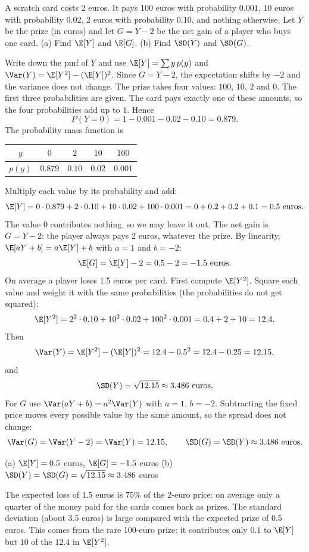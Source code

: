 
\begin{problem}
	A scratch card costs 2 euros. It pays 100 euros with probability $0.001$,
	10 euros with probability $0.02$, 2 euros with probability $0.10$, and
	nothing otherwise. Let $Y$ be the prize (in euros) and let $G=Y-2$ be the
	net gain of a player who buys one card. (a) Find $\E[Y]$ and $\E[G]$.
	(b) Find $\SD(Y)$ and $\SD(G)$.
\end{problem}

\begin{solution}
	\idea Write down the pmf of $Y$ and use $\E[Y]=\sum y\,p(y)$ and
	$\Var(Y)=\E[Y^2]-(\E[Y])^2$. Since $G=Y-2$, the expectation shifts by $-2$
	and the variance does not change.
	 The prize takes four values: $100$, $10$,
	$2$ and $0$. The first three probabilities are given. The card pays exactly
	one of these amounts, so the four probabilities add up to $1$. Hence
	\[ P(Y=0)=1-0.001-0.02-0.10=0.879. \]
	The probability mass function is
	\begin{center}
		\begin{tabular}{c|cccc}
			$y$      & $0$     & $2$    & $10$   & $100$   \\ \hline
			$p(y)$   & $0.879$ & $0.10$ & $0.02$ & $0.001$
		\end{tabular}
	\end{center}
	 Multiply each value by its probability and add:
	\[ \E[Y]=0\cdot0.879+2\cdot0.10+10\cdot0.02+100\cdot0.001
		=0+0.2+0.2+0.1=0.5 \text{ euros}. \]
	The value $0$ contributes nothing, so we may leave it out. The net gain is
	$G=Y-2$: the player always pays 2 euros, whatever the prize. By linearity,
	$\E[aY+b]=a\E[Y]+b$ with $a=1$ and $b=-2$:
	\[ \E[G]=\E[Y]-2=0.5-2=-1.5 \text{ euros}. \]
	On average a player loses 1.5 euros per card.
	 First compute $\E[Y^2]$. Square each value and weight it with the
	same probabilities (the probabilities do not get squared):
	\[ \E[Y^2]=2^2\cdot0.10+10^2\cdot0.02+100^2\cdot0.001
		=0.4+2+10=12.4. \]
	Then
	\[ \Var(Y)=\E[Y^2]-(\E[Y])^2=12.4-0.5^2=12.4-0.25=12.15, \]
	and
	\[ \SD(Y)=\sqrt{12.15}\approx3.486 \text{ euros}. \]
	For $G$ use $\Var(aY+b)=a^2\Var(Y)$ with $a=1$, $b=-2$. Subtracting the
	fixed price moves every possible value by the same amount, so the spread
	does not change:
	\[ \Var(G)=\Var(Y-2)=\Var(Y)=12.15, \qquad \SD(G)=\SD(Y)\approx3.486
		\text{ euros}. \]
	\begin{answer}
		(a) $\E[Y]=0.5$ euros, $\E[G]=-1.5$ euros \quad
		(b) $\SD(Y)=\SD(G)=\sqrt{12.15}\approx3.486$ euros
	\end{answer}
	\begin{remark}
		The expected loss of 1.5 euros is $75\%$ of the 2-euro price: on
		average only a quarter of the money paid for the cards comes back as
		prizes. The standard deviation (about 3.5 euros) is large compared with
		the expected prize of 0.5 euros. This comes from the rare 100-euro
		prize: it contributes only $0.1$ to $\E[Y]$ but $10$ of the $12.4$ in
		$\E[Y^2]$.


\end{remark}
\end{solution}
